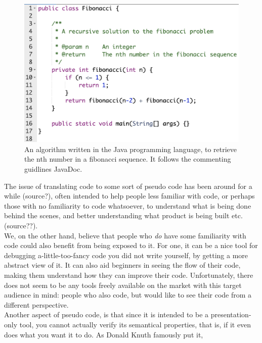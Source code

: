\begin{figure}[ht]
    \centering
    \includegraphics[scale=0.50]{assets/fibonacci_java.png}
    \caption[An algorithm written in the Java programming language, to retrieve the nth number in a fibonacci sequence.]{An algorithm written in the Java programming language, to retrieve the nth number in a fibonacci sequence. It follows the commenting guidlines JavaDoc\footnotemark.}
    \label{fig:fibjava}
\end{figure}


The issue of translating code to some sort of pseudo code has been around for a while (source?), often intended to help people less familiar with code, or perhaps those with no familiarity to code whatsoever, to understand what is being done behind the scenes, and better understanding what product is being built etc. (source??). \hfill \\

We, on the other hand, believe that people who \textit{do} have some familiarity with code could also benefit from being exposed to it. For one, it can be a nice tool for debugging a-little-too-fancy code you did not write yourself, by getting a more abstract view of it. It can also aid beginners in seeing the flow of their code, making them understand how they can improve their code. Unfortunately, there does not seem to be any tools freely available on the market with this target audience in mind: people who also code, but would like to see their code from a different perspective. \hfill \\

Another aspect of pseudo code, is that since it is intended to be a presentation-only tool, you cannot actually verify its semantical properties, that is, if it even does what you want it to do. As Donald Knuth famously put it,

